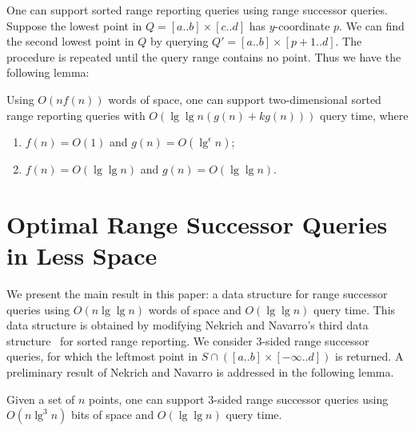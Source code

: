 \documentclass{llncs}
\begin{document}
One can support sorted range reporting queries using range successor queries.
Suppose the lowest point in $Q = [a..b]\times[c..d]$ has $y$-coordinate $p$.
We can find the second lowest point in $Q$ by querying $Q' = [a..b]\times[p+1..d]$.
The procedure is repeated until the query range contains no point.
Thus we have the following lemma:
\begin{lemma}
    Using $O(nf(n))$ words of space,
    one can support two-dimensional sorted range reporting queries with $O(\lg\lg n(g(n) + k g(n)))$ query time,
    where
    \begin{enumerate}
        \item $f(n) = O(1)$ and $g(n) = O(\lg^\epsilon n)$;
        \item $f(n) = O(\lg\lg n)$ and $g(n) = O(\lg\lg n)$.
    \end{enumerate}
\end{lemma}

\section{Optimal Range Successor Queries in Less Space}
\label{section_main}

We present the main result in this paper:
a data structure for range successor queries using $O(n\lg\lg n)$ words of space and $O(\lg\lg n)$ query time.
This data structure is obtained by modifying Nekrich and Navarro's third data structure~\cite{DBLP:conf/swat/NekrichN12} for sorted range reporting.
We consider 3-sided range successor queries,
for which the leftmost point in $S \cap ([a..b]\times[-\infty..d])$ is returned.
A preliminary result of Nekrich and Navarro is addressed in the following lemma.
\begin{lemma}
    \label{lemma_three_sided}
    Given a set of $n$ points, one can support 3-sided range successor queries
    using $O(n\lg^3 n)$ bits of space and $O(\lg\lg n)$ query time.
\end{lemma}
\end{document}
